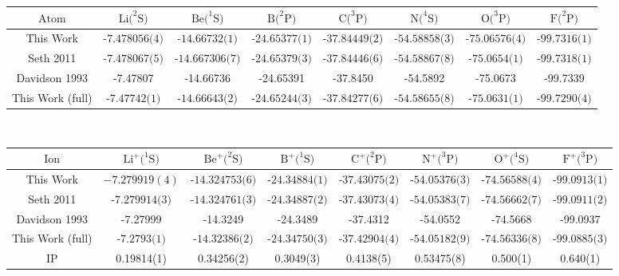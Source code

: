 \documentclass[aps,prl,superscriptaddress,groupedaddress]{revtex4}
\begin{document}
\begin{table*}[htpb!]
\setlength{\extrarowheight}{3pt}
\begin{tabular}{*{1}{*{8}{c}}}
\hline\hline
$\text{Atom}$ & $\text{Li}(^2\text{S)}$ & $\text{Be}(^1\text{S)}$ & $\text{B}(^2\text{P)}$ & $\text{C}(^3\text{P)}$ & $\text{N}(^4\text{S)}$ & $\text{O}(^3\text{P)}$ & $\text{F}(^2\text{P)}$ \\ \hline
This Work & $\text{-7.478056(4)}$ & $\text{-14.66732(1)}$ & $\text{-24.65377(1)}$ & $\text{-37.84449(2)}$ & $\text{-54.58858(3)}$ & $\text{-75.06576(4)}$ & $\text{-99.7316(1)}$ \\
Seth 2011 \cite{Seth_Bench} & $\text{-7.478067(5)}$ & $\text{-14.667306(7)}$ & $\text{-24.65379(3)}$ & $\text{-37.84446(6)}$ & $\text{-54.58867(8)}$ & $\text{-75.0654(1)}$ & $\text{-99.7318(1)}$ \\
Davidson 1993 \cite{Davidson_Atoms} &  -7.47807 & -14.66736 & -24.65391 & -37.8450 &-54.5892 & -75.0673 & -99.7339 \\
This Work (full) & $\text{-7.47742(1)}$ & $\text{-14.66643(2)}$ & $\text{-24.65244(3)}$ & $\text{-37.84277(6)}$ & $\text{-54.58655(8)}$ & $\text{-75.0631(1)}$ & $\text{-99.7290(4)}$ \\
\hline
\end{tabular} \\ 
\begin{tabular}{*{1}{*{8}{c}}}
$\text{Ion}$ & $\text{Li}^+(^1\text{S)}$ & $\text{Be}^+(^2\text{S)}$ & $\text{B}^+(^1\text{S)}$ & $\text{C}^+(^2\text{P)}$ & $\text{N}^+(^3\text{P)}$ & $\text{O}^+(^4\text{S)}$ & $\text{F}^+(^3\text{P)}$ \\ \hline
This Work & $-7.279919(4)$ & $\text{-14.324753(6)}$ & $\text{-24.34884(1)}$ & $\text{-37.43075(2)}$ & $\text{-54.05376(3)}$ & $\text{-74.56588(4)}$ & $\text{-99.0913(1)}$ \\
Seth 2011 \cite{Seth_Bench} & $\text{-7.279914(3)}$ & $\text{-14.324761(3)}$ & $\text{-24.34887(2)}$ & $\text{-37.43073(4)}$ & $\text{-54.05383(7)}$ & $\text{-74.56662(7)}$ & $\text{-99.0911(2)}$ \\
Davidson 1993 \footnotemark[1] \cite{Davidson_Atoms} & -7.27999 & -14.3249 & -24.3489 & -37.4312 & -54.0552 & -74.5668 & -99.0937 \\
This Work (full) & $\text{-7.2793(1)}$ & $\text{-14.32386(2)}$ & $\text{-24.34750(3)}$ & $\text{-37.42904(4)}$ & $\text{-54.05182(9)}$ & $\text{-74.56336(8)}$ & $\text{-99.0885(3)}$ \\
\hline
IP & 0.19814(1) & 0.34256(2) & 0.3049(3) & 0.4138(5) & 0.53475(8) & 0.500(1) & 0.640(1) \\

\end{tabular}
\end{table*}
\end{document}
